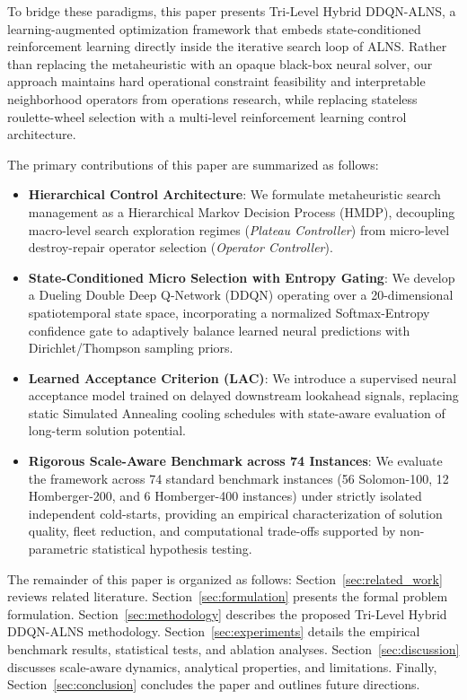 \documentclass{ieeeaccess}
\begin{document}
To bridge these paradigms, this paper presents Tri-Level Hybrid DDQN-ALNS, a learning-augmented optimization framework that embeds state-conditioned reinforcement learning directly inside the iterative search loop of ALNS. Rather than replacing the metaheuristic with an opaque black-box neural solver, our approach maintains hard operational constraint feasibility and interpretable neighborhood operators from operations research, while replacing stateless roulette-wheel selection with a multi-level reinforcement learning control architecture. 

The primary contributions of this paper are summarized as follows:
\begin{itemize}
    \item \textbf{Hierarchical Control Architecture}: We formulate metaheuristic search management as a Hierarchical Markov Decision Process (HMDP), decoupling macro-level search exploration regimes (\emph{Plateau Controller}) from micro-level destroy-repair operator selection (\emph{Operator Controller}).
    \item \textbf{State-Conditioned Micro Selection with Entropy Gating}: We develop a Dueling Double Deep Q-Network (DDQN) operating over a 20-dimensional spatiotemporal state space, incorporating a normalized Softmax-Entropy confidence gate to adaptively balance learned neural predictions with Dirichlet/Thompson sampling priors.
    \item \textbf{Learned Acceptance Criterion (LAC)}: We introduce a supervised neural acceptance model trained on delayed downstream lookahead signals, replacing static Simulated Annealing cooling schedules with state-aware evaluation of long-term solution potential.
    \item \textbf{Rigorous Scale-Aware Benchmark across 74 Instances}: We evaluate the framework across 74 standard benchmark instances (56 Solomon-100, 12 Homberger-200, and 6 Homberger-400 instances) under strictly isolated independent cold-starts, providing an empirical characterization of solution quality, fleet reduction, and computational trade-offs supported by non-parametric statistical hypothesis testing.
\end{itemize}

The remainder of this paper is organized as follows: Section~\ref{sec:related_work} reviews related literature. Section~\ref{sec:formulation} presents the formal problem formulation. Section~\ref{sec:methodology} describes the proposed Tri-Level Hybrid DDQN-ALNS methodology. Section~\ref{sec:experiments} details the empirical benchmark results, statistical tests, and ablation analyses. Section~\ref{sec:discussion} discusses scale-aware dynamics, analytical properties, and limitations. Finally, Section~\ref{sec:conclusion} concludes the paper and outlines future directions.
\end{document}
